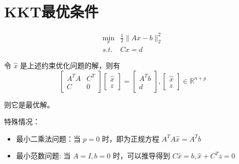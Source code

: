 \section{KKT最优条件}

\begin{problem}
    $$\begin{aligned}
        \min _{x} & \frac{1}{2}\|A x-b\|_{2}^{2}\\
        s.t. & C x=d
    \end{aligned}$$
\end{problem}

\begin{theorem}
    令 $ \hat{x} $ 是上述约束优化问题的解，则有
$$
\left[\begin{array}{cc}
A^{T} A & C^{T} \\
C& 0
\end{array}\right]\left[\begin{array}{l}
\hat{x} \\
z
\end{array}\right]=\left[\begin{array}{l}
A^{T} b \\
d
\end{array}\right],\left[\begin{array}{l}
\hat{x} \\
z
\end{array}\right] \in \mathbb{R}^{n+p}
$$

则它是最优解。
\end{theorem}


特殊情况：

\begin{itemize}
    \item 最小二乘法问题：当 $ p=0 $ 时，即为正规方程 $ A^{T} A \hat{x}=A^{T} b $
    \item 最小范数问题: 当 $ A=I, b=0 $ 时，可以推导得到 $ C \hat{x}=b, \hat{x}+C^{T} z=0 $
\end{itemize}


